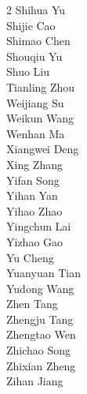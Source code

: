 \begin{multicols}{2}
Shihua Yu \\
Shijie Cao   \\
Shimao Chen \\
Shouqiu Yu \\
Shuo Liu \\
Tianling Zhou \\
Weijiang Su \\
Weikun Wang \\
Wenhan Ma \\
Xiangwei Deng \\
Xing Zhang \\
Yifan Song \\
Yihan Yan \\
Yihao Zhao   \\
Yingchun Lai \\
Yizhao Gao   \\
Yu Cheng   \\
Yuanyuan Tian \\
Yudong Wang \\
Zhen Tang \\
Zhengju Tang   \\
Zhengtao Wen \\
Zhichao Song \\
Zhixian Zheng \\
Zihan Jiang \\


\end{multicols}
